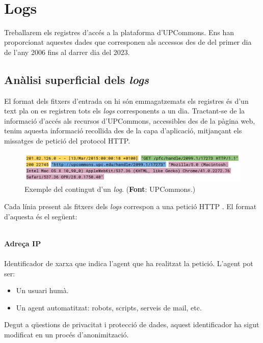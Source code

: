 \noindent \\
\section{Logs}\label{sec:logs-processing}

Treballarem els registres d'accés a la plataforma d'UPCommons.
Ens han proporcionat aquestes dades que corresponen als accessos des de del primer dia de l'any 2006 fins al darrer dia del 2023.

\clearpage

\subsection{Anàlisi superficial dels \textit{\gls{log}s}}\label{subsec:log-analysis}

El format dels fitxers d'entrada on hi són emmagatzemats els registres és d'un text pla on es registren tots els \textit{\gls{log}s} corresponents a un dia.
Tractant-se de la informació d'accés als recursos d'\gls{UPCommons}, accessibles des de la pàgina web,
tenim aquesta informació recollida des de la capa d'aplicació, mitjançant els missatges de petició del protocol \gls{HTTP}.

\begin{figure}[htbp]
    \centerline{\includegraphics[width=1\textwidth]{figures/example-log}}
    \captionsetup{justification=centering}
    \caption{Exemple del contingut d'un \textit{\gls{log}}. (\textbf{Font}: \gls{UPCommons}.)}\label{fig:example-log}
\end{figure}


\noindent
Cada línia present als fitxers dels \textit{\gls{log}s} correspon a una petició \gls{HTTP} .
El format d'aquesta és el següent:

\noindent \\
\textbf{Adreça \gls{IP}} \\ \\
Identificador de xarxa que indica l'agent que ha realitzat la petició.
L'agent pot ser:
\begin{itemize}
    \item Un usuari humà.
    \item Un agent automatitzat: robots, scripts, serveis de mail, etc.
\end{itemize}
Degut a qüestions de privacitat i protecció de dades, aquest identificador ha sigut modificat en un procés d'anonimització. \\

